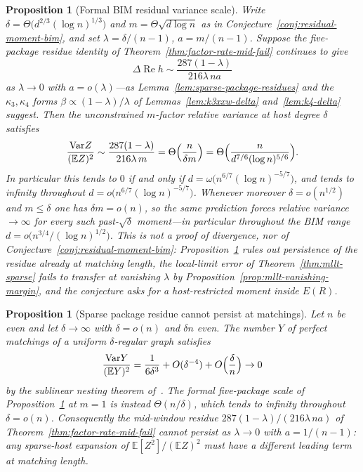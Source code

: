 \documentclass[11pt]{article}
\newtheorem{proposition}[theorem]{Proposition}
\newcommand{\EE}{\mathbb{E}}
\newcommand{\Var}{\mathrm{Var}}
\begin{document}
\begin{proposition}[Formal BIM residual variance scale]
\label{prop:bim-residual-scale}
Write \(\delta=\Theta\bigl(d^{2/3}(\log n)^{1/3}\bigr)\) and
\(m=\Theta\sqrt{d\log n}\) as in Conjecture~\ref{conj:residual-moment-bim},
and set \(\lambda=\delta/(n-1)\), \(a=m/(n-1)\). Suppose the five-package
residue identity of Theorem~\ref{thm:factor-rate-mid-fail} continues to give
\[
\Delta\operatorname{Re}h
\sim
\frac{287(1-\lambda)}{216\lambda\,na}
\]
as \(\lambda\to0\) with \(a=o(\lambda)\)---as Lemma~\ref{lem:sparse-package-residues}
and the \(\kappa_3,\kappa_4\) forms \(\beta\propto(1-\lambda)/\lambda\) of
Lemmas~\ref{lem:k3xxw-delta} and~\ref{lem:k4-delta} suggest.
Then the unconstrained \(m\)-factor relative variance at host degree \(\delta\)
satisfies
\[
\frac{\Var Z}{(\EE Z)^2}
\sim
\frac{287(1-\lambda)}{216\lambda\,m}
=
\Theta\Bigl(\frac{n}{\delta m}\Bigr)
=
\Theta\Bigl(\frac{n}{d^{7/6}(\log n)^{5/6}}\Bigr).
\]
In particular this tends to \(0\) if and only if
\(d=\omega\bigl(n^{6/7}(\log n)^{-5/7}\bigr)\), and tends to infinity throughout
\(d=o\bigl(n^{6/7}(\log n)^{-5/7}\bigr)\).
Whenever moreover \(\delta=o(n^{1/2})\) and \(m\le\delta\) one has
\(\delta m=o(n)\), so the same prediction forces relative variance \(\to\infty\)
for every such past-\(\sqrt\delta\) moment---in particular throughout the BIM
range \(d=o\bigl(n^{3/4}/(\log n)^{1/2}\bigr)\).
This is not a proof of divergence, nor of Conjecture~\ref{conj:residual-moment-bim}:
Proposition~\ref{prop:package-not-persist} rules out persistence of the residue
already at matching length, the local-limit error of
Theorem~\ref{thm:mllt-sparse} fails to transfer at vanishing \(\lambda\) by
Proposition~\ref{prop:mllt-vanishing-margin}, and the conjecture asks for a
host-restricted moment inside \(E(R)\).
\end{proposition}

\begin{proposition}[Sparse package residue cannot persist at matchings]
\label{prop:package-not-persist}
Let \(n\) be even and let \(\delta\to\infty\) with \(\delta=o(n)\) and \(\delta n\) even.
The number \(Y\) of perfect matchings of a uniform \(\delta\)-regular graph
satisfies
\[
\frac{\Var Y}{(\EE Y)^2}
=
\frac1{6\delta^3}+O(\delta^{-4})+O\Bigl(\frac\delta n\Bigr)
\to0
\]
by the sublinear nesting theorem of~\cite{PlusOneV1}. The formal five-package
scale of Proposition~\ref{prop:bim-residual-scale} at \(m=1\) is instead
\(\Theta(n/\delta)\), which tends to infinity throughout \(\delta=o(n)\).
Consequently the mid-window residue
\(287(1-\lambda)/(216\lambda\,na)\) of Theorem~\ref{thm:factor-rate-mid-fail}
cannot persist as \(\lambda\to0\) with \(a=1/(n-1)\): any sparse-host
expansion of \(\EE[Z^2]/(\EE Z)^2\) must have a different leading term at
matching length.
\end{proposition}
\end{document}
